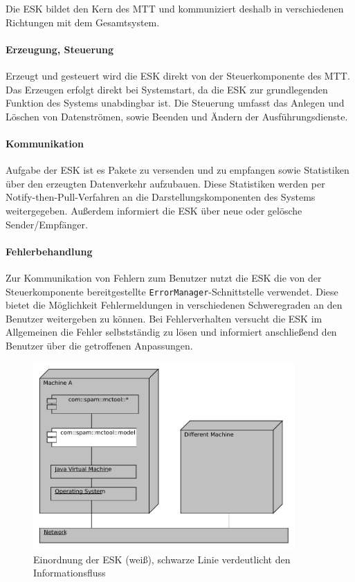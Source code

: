 Die ESK bildet den Kern des MTT und kommuniziert deshalb in verschiedenen
Richtungen mit dem Gesamtsystem.

\paragraph{Erzeugung, Steuerung}
Erzeugt und gesteuert wird die ESK direkt von der Steuerkomponente des MTT. Das
Erzeugen erfolgt direkt bei Systemstart, da die ESK zur grundlegenden Funktion
des Systems unabdingbar ist. Die Steuerung umfasst das Anlegen und Löschen von
Datenströmen, sowie Beenden und Ändern der Ausführungsdienste.

\paragraph{Kommunikation}
Aufgabe der ESK ist es Pakete zu versenden und zu empfangen sowie Statistiken
über den erzeugten Datenverkehr aufzubauen. Diese Statistiken werden per
Notify-then-Pull-Verfahren an die Darstellungskomponenten des Systems
weitergegeben. Außerdem informiert die ESK über neue oder gelösche Sender/Empfänger.

\paragraph{Fehlerbehandlung}
Zur Kommunikation von Fehlern zum Benutzer nutzt die ESK die von der
Steuerkomponente bereitgestellte \texttt{ErrorManager}-Schnittstelle verwendet.
Diese bietet die Möglichkeit Fehlermeldungen in verschiedenen Schweregraden an
den Benutzer weitergeben zu können.
Bei Fehlerverhalten versucht die ESK im Allgemeinen die Fehler selbstständig zu
lösen und informiert anschließend den Benutzer über die getroffenen Anpassungen.

\begin{figure}[H]
\center
\includegraphics[width=10cm]{images/Verteilungsdiagramm.pdf}
\caption{Einordnung der ESK (weiß), schwarze Linie verdeutlicht den
Informationsfluss}
\end{figure}

